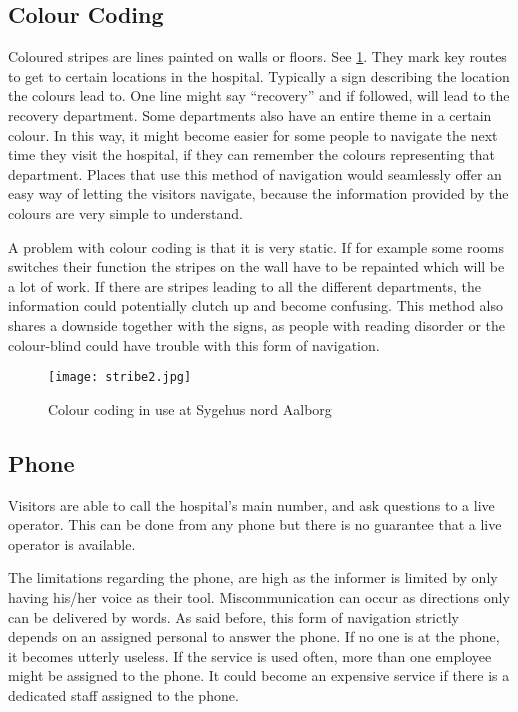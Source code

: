 \subsection{Colour Coding}\label{sub:col}
Coloured stripes are lines painted on walls or floors. See \cref{fig:colour_floor}. They mark key routes to get to certain locations in the hospital. Typically a sign describing the location the colours lead to. One line might say \enquote{recovery} and if followed, will lead to the recovery department. Some departments also have an entire theme in a certain colour. In this way, it might become easier for some people to navigate the next time they visit the hospital, if they can remember the colours representing that department.
Places that use this method of navigation would seamlessly offer an easy way of letting the visitors navigate, because the information provided by the colours are very simple to understand.

A problem with colour coding is that it is very static. If for example some rooms switches their function the stripes on the wall have to be repainted which will be a lot of work. If there are stripes leading to all the different departments, the information could potentially clutch up and become confusing. This method also shares a downside together with the signs, as people with reading disorder  or the colour-blind could have trouble with this form of navigation.

\begin{figure}[htb]
  \begin{center} 
    \texttt{[image: stribe2.jpg]}
  \end{center}
  \caption{Colour coding in use at Sygehus nord Aalborg}
  \label{fig:colour_floor}
\end{figure}




\subsection{Phone}\label{sub:pho}
Visitors are able to call the hospital's main number, and ask questions to a live operator. This can be done from any phone but there is no guarantee that a live operator is available. \cite{sign_ring}
 
The limitations regarding the phone, are high as the informer is limited by only having his/her voice as their tool. Miscommunication can occur as directions only can be delivered by words. As said before, this form of navigation strictly depends on an assigned personal to answer the phone. If no one is at the phone, it becomes utterly useless.
If the service is used often, more than one employee might be assigned to the phone. It could become an expensive service if there is a dedicated staff assigned to the phone.



